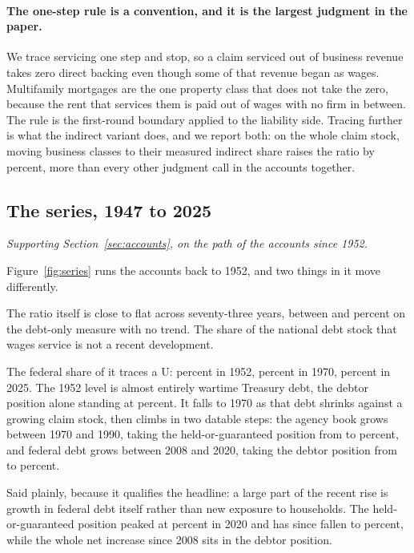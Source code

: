 \paragraph{The one-step rule is a convention, and it is the largest judgment in the paper.} We
trace servicing one step and stop, so a claim serviced out of business revenue takes zero direct
backing even though some of that revenue began as wages. Multifamily mortgages are the one
property class that does not take the zero, because the rent that services them is paid out of
wages with no firm in between. The rule is the first-round boundary applied to the liability side.
Tracing further is what the indirect variant does, and we report both: on the whole claim stock,
moving business classes to their measured indirect share raises the ratio by
 percent, more than every other judgment call in the accounts
together.

\subsection{The series, 1947 to 2025}

\emph{Supporting Section~\ref{sec:accounts}, on the path of the accounts since 1952.}

Figure~\ref{fig:series} runs the accounts back to 1952, and two things in it move differently.

The ratio itself is close to flat across seventy-three years, between
 and  percent on the debt-only measure with
no trend. The share of the national debt stock that wages service is not a recent development.

The federal share of it traces a U:  percent in 1952,
 percent in 1970,  percent in 2025. The 1952 level is
almost entirely wartime Treasury debt, the debtor position alone standing at
 percent. It falls to 1970 as that debt shrinks against a growing claim
stock, then climbs in two datable steps: the agency book grows between 1970 and 1990, taking the
held-or-guaranteed position from  to  percent, and federal
debt grows between 2008 and 2020, taking the debtor position from  to
 percent.

Said plainly, because it qualifies the headline: a large part of the recent rise is growth in
federal debt itself rather than new exposure to households. The held-or-guaranteed position peaked
at  percent in 2020 and has since fallen to  percent,
while the whole net increase since 2008 sits in the debtor position.

